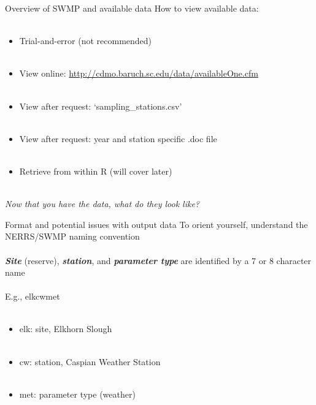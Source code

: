 \documentclass[xcolor=svgnames]{beamer}\usepackage[]{graphicx}\usepackage[]{color}
\newcommand{\Bigtxt}[1]{\textbf{\textit{#1}}}
\begin{document}
\begin{frame}{Overview of SWMP and available data}
\onslide<+->
How to view available data:\\~\\
\begin{itemize}
\item Trial-and-error (not recommended) \\~\\
\item View online: \href{http://cdmo.baruch.sc.edu/data/availableOne.cfm}{http://cdmo.baruch.sc.edu/data/availableOne.cfm}  \\~\\
\item View after request: `sampling_stations.csv'  \\~\\
\item View after request: year and station specific .doc file  \\~\\
\item Retrieve from within R (will cover later) \\~\\
\end{itemize}
\onslide<+->
\centerline{\emph{Now that you have the data, what do they look like?}} 
\end{frame}

\begin{frame}{Format and potential issues with output data}
\onslide<+->
To orient yourself, understand the NERRS/SWMP naming convention\\~\\
\Bigtxt{Site} (reserve), \Bigtxt{station}, and \Bigtxt{parameter type} are identified by a 7 or 8 character name \\~\\
\onslide<+->
E.g., elkcwmet \\~\\
\onslide<+->
\begin{itemize}
\item elk: site, Elkhorn Slough \\~\\
\item cw: station, Caspian Weather Station \\~\\
\item met: parameter type (weather)
\end{itemize}
\end{frame}
\end{document}
